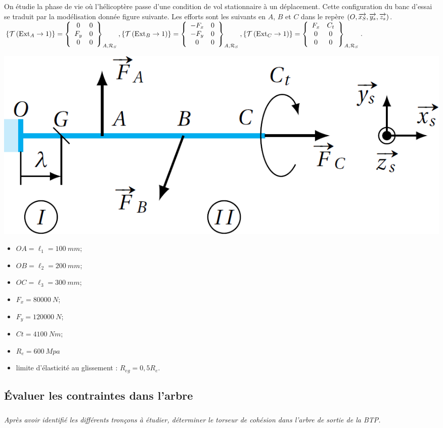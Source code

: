 \documentclass[10pt,fleqn]{article} %
\begin{document}
\begin{multicols}{2}
On étudie la phase de vie où l’hélicoptère passe d’une condition de vol stationnaire
à un déplacement. Cette configuration du banc d’essai se traduit par la modélisation
donnée figure suivante. Les efforts sont les suivants en $A$, $B$ et $C$ dans le repère $\repere{O}{x_S}{y_s}{z_s}$.
$
\torseurstat{T}{\text{Ext}_A}{1} = \torseurcol{0}{F_y}{0}{0}{0}{0}{A,\mathcal{R}_S}, 
\torseurstat{T}{\text{Ext}_B}{1} = \torseurcol{-F_x}{-F_y}{0}{0}{0}{0}{A,\mathcal{R}_S}, 
\torseurstat{T}{\text{Ext}_C}{1} = \torseurcol{F_x}{0}{0}{C_t}{0}{0}{A,\mathcal{R}_S}
$.

\begin{center}
\includegraphics[width=\linewidth]{images/fig_05}
\end{center}

\begin{multicols}{2}
\begin{itemize}
\item $OA = \ell_1 = \SI{100}{mm}$;
\item $OB = \ell_2 = \SI{200}{mm}$;
\item $OC = \ell_3 = \SI{300}{mm}$;
\item $F_x = \SI{80000}{N}$; 
\item $F_y = \SI{120000}{N}$;
\item $Ct = \SI{4100}{Nm}$;
\item $R_e = \SI{600}{Mpa}$ 
\item limite d’élasticité au glissement : $R_{eg} = 0,5R_e$.
\end{itemize}
\end{multicols}


\subsection*{Évaluer les contraintes dans l’arbre}

\subparagraph{}\textit{Après avoir identifié les différents tronçons à étudier, déterminer le torseur de
cohésion dans l’arbre de sortie de la BTP.}


\end{multicols}
\end{document}
